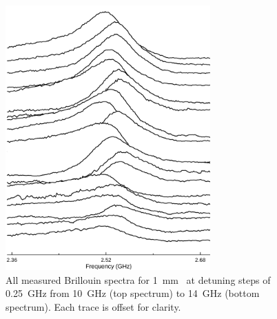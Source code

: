 \begin{figure}[ht]
  \centering
  \includegraphics[width=0.7\textwidth]{figs/4-CABS/JoyDivisionCABSCS2.pdf}
  \caption{All measured Brillouin spectra for \SI{1}{\milli\meter}~ at detuning steps of \SI{0.25}{\giga\hertz} from \SI{10}{\giga\hertz} (top spectrum) to \SI{14}{\giga\hertz} (bottom spectrum). Each trace is offset for clarity.}
  \label{fig:Joy Division CS2}
\end{figure}

\FloatBarrier

